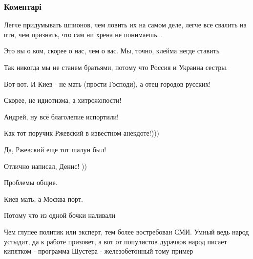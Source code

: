  
 
 
 
 
\subsubsection{Коментарі}

\begin{itemize} %
Легче придумывать шпионов, чем ловить их на самом деле, легче все свалить на птн, чем признать, что сам ни хрена не понимаешь...

Это вы о ком, скорее о нас, чем о вас. Мы, точно, клейма негде ставить

Так никогда мы не станем братьями, потому что Россия и Украина сестры.

Вот-вот. И Киев - не мать (прости Господи), а отец городов русских!

Скорее, не идиотизма, а хитрожопости!

Андрей, ну всё благолепие испортили!

Как тот поручик Ржевский в известном анекдоте!)))

Да, Ржевский еще тот шалун был!

Отлично написал, Денис! ))

Проблемы общие.

Киев мать, а Москва порт.

Потому что из одной бочки наливали


Чем глупее политик или эксперт, тем более востребован СМИ. Умный ведь народ
устыдит, да к работе призовет, а вот от популистов дурачков народ писает
кипятком - программа Шустера - железобетонный тому пример

\end{itemize} %
